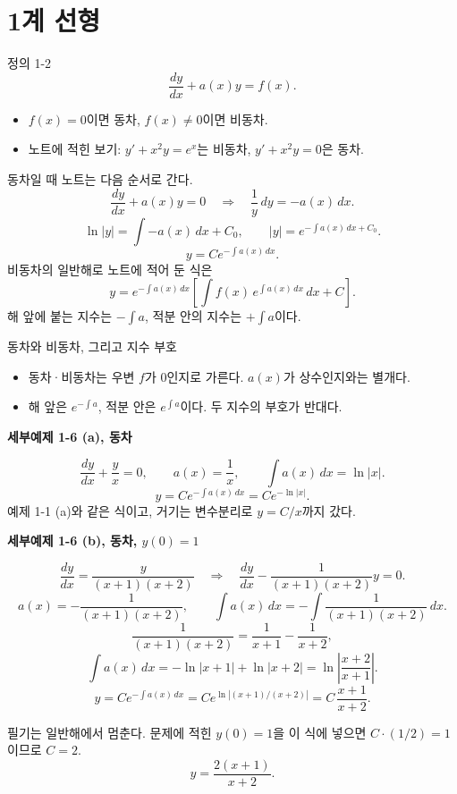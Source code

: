 \documentclass[11pt]{article}
\newcommand{\ex}[1]{\par\textbf{세부\quad #1}\par}
\begin{document}
\section{1계 선형}

\begin{mainbox}{정의 1-2}
\[
\frac{dy}{dx}+a(x)y=f(x).
\]
\begin{itemize}
\item \(f(x)=0\)이면 동차, \(f(x)\neq 0\)이면 비동차.
\item 노트에 적힌 보기: \(y'+x^{2}y=e^{x}\)는 비동차, \(y'+x^{2}y=0\)은 동차.
\end{itemize}
동차일 때 노트는 다음 순서로 간다.
\[
\frac{dy}{dx}+a(x)y=0
\quad\Rightarrow\quad
\frac{1}{y}\,dy=-a(x)\,dx.
\]
\[
\ln|y|=\int -a(x)\,dx+C_0,\qquad
|y|=e^{-\int a(x)\,dx+C_0}.
\]
\[
y=Ce^{-\int a(x)\,dx}.
\]
비동차의 일반해로 노트에 적어 둔 식은
\begin{equation}
y=e^{-\int a(x)\,dx}
\left[\int f(x)\,e^{\int a(x)\,dx}\,dx+C\right].
\label{eq:general}
\end{equation}
해 앞에 붙는 지수는 \(-\int a\), 적분 안의 지수는 \(+\int a\)이다.
\end{mainbox}

\begin{confbox}{동차와 비동차, 그리고 지수 부호}
\begin{itemize}
\item 동차·비동차는 우변 \(f\)가 \(0\)인지로 가른다. \(a(x)\)가 상수인지와는 별개다.
\item 해 앞은 \(e^{-\int a}\), 적분 안은 \(e^{\int a}\)이다. 두 지수의 부호가 반대다.
\end{itemize}
\end{confbox}

\ex{예제 1-6 (a), 동차}
\[
\frac{dy}{dx}+\frac{y}{x}=0,\qquad
a(x)=\frac{1}{x},\qquad
\int a(x)\,dx=\ln|x|.
\]
\[
y=Ce^{-\int a(x)\,dx}=Ce^{-\ln|x|}.
\]
예제 1-1 (a)와 같은 식이고, 거기는 변수분리로 \(y=C/x\)까지 갔다.

\ex{예제 1-6 (b), 동차, \(y(0)=1\)}
\[
\frac{dy}{dx}=\frac{y}{(x+1)(x+2)}
\quad\Rightarrow\quad
\frac{dy}{dx}-\frac{1}{(x+1)(x+2)}y=0.
\]
\[
a(x)=-\frac{1}{(x+1)(x+2)},\qquad
\int a(x)\,dx=-\int\frac{1}{(x+1)(x+2)}\,dx.
\]
\[
\frac{1}{(x+1)(x+2)}=\frac{1}{x+1}-\frac{1}{x+2},
\]
\[
\int a(x)\,dx
=-\ln|x+1|+\ln|x+2|
=\ln\left|\frac{x+2}{x+1}\right|.
\]
\[
y=Ce^{-\int a(x)\,dx}
=Ce^{\ln|(x+1)/(x+2)|}
=C\,\frac{x+1}{x+2}.
\]
\begin{fillbox}
필기는 일반해에서 멈춘다. 문제에 적힌 \(y(0)=1\)을 이 식에 넣으면 \(C\cdot(1/2)=1\)이므로 \(C=2\).
\[
y=\frac{2(x+1)}{x+2}.
\]
\end{fillbox}
\end{document}
